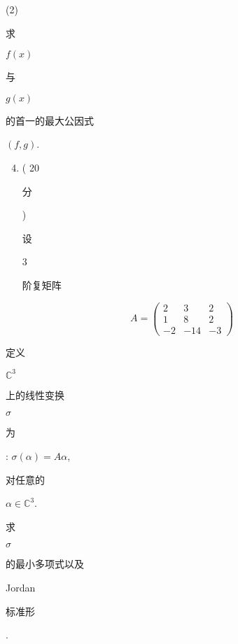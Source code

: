 \documentclass[10pt]{article}
\begin{document}
(2) \begin{CJK}{UTF8}{mj}求\end{CJK} $f(x)$ \begin{CJK}{UTF8}{mj}与\end{CJK} $g(x)$ \begin{CJK}{UTF8}{mj}的首一的最大公因式\end{CJK} $(f, g)$.

\begin{enumerate}
  \setcounter{enumi}{3}
  \item ( 20 \begin{CJK}{UTF8}{mj}分\end{CJK}) \begin{CJK}{UTF8}{mj}设\end{CJK} 3 \begin{CJK}{UTF8}{mj}阶复矩阵\end{CJK}
\end{enumerate}
$$
A=\left(\begin{array}{ccc}
2 & 3 & 2 \\
1 & 8 & 2 \\
-2 & -14 & -3
\end{array}\right)
$$
\begin{CJK}{UTF8}{mj}定义\end{CJK} $\mathbb{C}^{3}$ \begin{CJK}{UTF8}{mj}上的线性变换\end{CJK} $\sigma$ \begin{CJK}{UTF8}{mj}为\end{CJK}: $\sigma(\alpha)=A \alpha$, \begin{CJK}{UTF8}{mj}对任意的\end{CJK} $\alpha \in \mathbb{C}^{3}$. \begin{CJK}{UTF8}{mj}求\end{CJK} $\sigma$ \begin{CJK}{UTF8}{mj}的最小多项式以及\end{CJK} Jordan \begin{CJK}{UTF8}{mj}标准形\end{CJK}.
\end{document}
